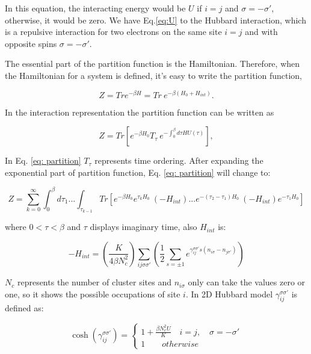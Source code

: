 \noindent In this equation, the interacting energy would be $U$ if $i=j$ and $\sigma=-\sigma'$, otherwise, it would be zero. We have Eq.\ref{eq:U} to the Hubbard interaction, which is a repulsive interaction for two electrons on the same site $i=j$ and with opposite spins $\sigma=-\sigma'$.  

The essential part of the partition function is the Hamiltonian. Therefore, when the Hamiltonian for a system is defined, it's easy to write the partition function, \cite{werner} 

\begin{equation}
    Z= Tr  e^{-\beta H}= Tr \: e^{-\beta (H_0 +H_{int})}.
\end{equation}

\noindent In the interaction representation the partition function can be written as 

\begin{equation}
    Z= Tr \left[e^{-\beta H_0} T_{\tau}  \: e^{-\int _0 ^{\beta} d \tau H U(\tau)}\right], 
    \label{eq: partition}
\end{equation}

\noindent In Eq. \ref{eq: partition} $T_{\tau}$ represents time ordering. After expanding the exponential part of partition function, Eq. \ref{eq: partition} will change to:

\begin{equation}
    Z= \sum _{k=0}^\infty \int_0 ^\beta d\tau _1 ... \int _{\tau _{k-1}} Tr \left[e^{-\beta H_0} e^ {\tau _k H_0} \: (-H_{int})... e^{-(\tau _2 - \tau _1)H_0} \: (-H_{int}) e^{-\tau _1 H_0}\right]
\end{equation}

\noindent where $0<\tau<\beta$ and $\tau$ displays imaginary time, also $H_{int}$ is: 

\begin{equation}
    -H_{int}= \left(\frac{K}{4\beta N_c ^2}\right) \sum _{ij \sigma \sigma'} \left(\frac{1}{2} \sum _{s=\pm 1} e^{\gamma _{ij} ^{\sigma \sigma'} s(n_{i\sigma}- n_{j\sigma'})}\right)
\end{equation}

\noindent $N_c$ represents the number of cluster sites and $n_{i \sigma}$ only can take the values zero or one, so it shows the possible occupations of site $i$. In 2D Hubbard model $\gamma _{ij} ^{\sigma \sigma'}$ is defined as:

\begin{equation}
    \cosh(\gamma _{ij} ^{\sigma \sigma'})= \begin{cases}
    1+\frac{\beta N_c ^2 U}{K} \quad i=j, \quad \sigma = -\sigma ' \\
    1  \qquad otherwise
    \end{cases}
    \label{eq:potential}
\end{equation}

